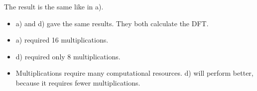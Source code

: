 \begin{solution}
\begin{tasks}
		The result is the same like in a).
		
		\task
		\begin{itemize}
			\item a) and d) gave the same results. They both calculate the DFT.
			\item a) required 16 multiplications.
			\item d) required only 8 multiplications.
			\item Multiplications require many computational resources. d) will perform better, because it requires fewer multiplications.
		\end{itemize}
		
	\end{tasks}
\end{solution}

%
